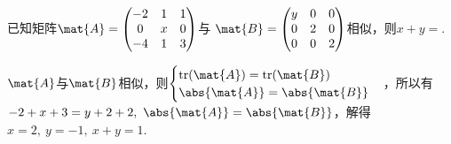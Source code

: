 \begin{problem}
    已知矩阵$\mat{A}=\begin{pmatrix}
        -2 & 1 & 1\\
        0 & x & 0\\
        -4 & 1 & 3
    \end{pmatrix}$与
    $\mat{B}=\begin{pmatrix}
        y & 0 & 0\\
        0 & 2 & 0\\
        0 & 0 & 2
    \end{pmatrix}$相似，则$x+y=$.
\end{problem}
\begin{solution}
    $\mat{A}$与$\mat{B}$相似，则$\begin{cases}
        \text{tr}(\mat{A})=\text{tr}(\mat{B})\\
        \abs{\mat{A}}=\abs{\mat{B}}
    \end{cases}$，所以有
    $
    -2+x+3=y+2+2,\ \abs{\mat{A}}=\abs{\mat{B}}
    $，解得$x=2,\ y=-1,\ x+y=1$.
\end{solution}


